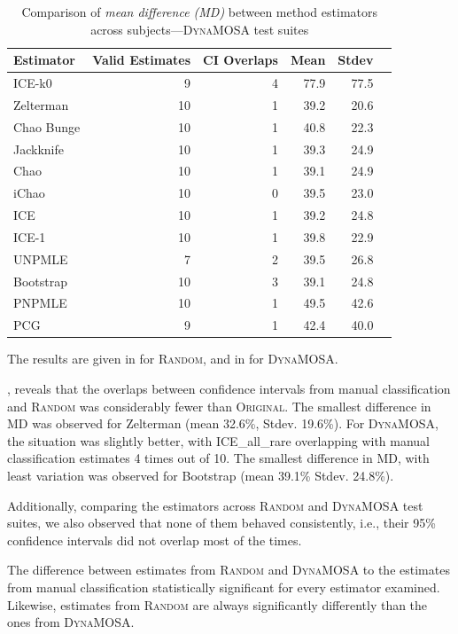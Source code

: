 \documentclass[sigconf,review,anonymous]{acmart}
\newcommand{\ICEallrare}{ICE-k0\xspace}
\newcommand{\Zelterman}{Zelterman\xspace}
\newcommand{\ChaoBunge}{Chao Bunge\xspace}
\newcommand{\Jackknife}{Jackknife\xspace}
\newcommand{\Chao}{Chao\xspace}
\newcommand{\improvedChao}{iChao\xspace}
\newcommand{\ICE}{ICE\xspace}
\newcommand{\improvedICE}{ICE-1\xspace}
\newcommand{\Unpmle}{UNPMLE\xspace}
\newcommand{\Bootstrap}{Bootstrap\xspace}
\newcommand{\Pnpmle}{PNPMLE\xspace}
\newcommand{\PCG}{PCG\xspace}
\newcommand{\original}{\textsc{Original}\xspace}
\newcommand{\EvosuiteRandom}{\textsc{Random}\xspace}
\newcommand{\EvosuiteDynamosa}{\textsc{DynaMOSA}\xspace}
\begin{document}
\begin{table}
\caption{Comparison of \emph{mean difference (MD)} between method
estimators across subjects---\EvosuiteDynamosa test suites}
\begin{tabular}{|l|r|r|r|r|r|}
\hline
Estimator	&Valid Estimates	&CI Overlaps	&Mean	&Stdev	\\
\hline
\ICEallrare	&	9	&	4	&77.9	&	77.5\\
\Zelterman	&	10	&	1	&39.2	&	20.6\\
\ChaoBunge	&	10	&	1	&40.8	&	22.3\\
\Jackknife	&	10	&	1	&39.3	&	24.9\\
\Chao	&	10	&	1	&39.1	&	24.9\\
\improvedChao	&	10	&	0	&39.5	&	23.0\\
\ICE	&	10	&	1	&39.2	&	24.8\\
\improvedICE	&	10	&	1	&39.8	&	22.9\\
\Unpmle	&	7	&	2	&39.5	&	26.8\\
\Bootstrap	&	10	&	3	&39.1	&	24.8\\
\Pnpmle	&	10	&	1	&49.5	&	42.6\\
\PCG	&	9	&	1	&42.4	&	40.0\\
\hline
\end{tabular}
\label{tbl:estdynamosa}
\end{table}
The results are given in  for \EvosuiteRandom, and in
 for \EvosuiteDynamosa.

, reveals that the overlaps between confidence intervals
from manual classification and \EvosuiteRandom was considerably fewer than \original.
The smallest difference in MD was observed for \Zelterman
(mean 32.6\%, Stdev. 19.6\%).
%
For \EvosuiteDynamosa, the situation was slightly better, with ICE\_all\_rare
overlapping with manual classification estimates 4 times out of 10.
The smallest difference in MD, with least variation was observed for
Bootstrap (mean 39.1\% Stdev. 24.8\%).

Additionally, comparing the estimators across \EvosuiteRandom and \EvosuiteDynamosa
test suites, we also observed that none of them behaved consistently, i.e.,
their 95\% confidence intervals did not overlap most of the times.

\begin{tcolorbox}[boxrule=0.5pt, arc=4pt, boxsep=0pt, width=\columnwidth]
The difference between estimates from \EvosuiteRandom and \EvosuiteDynamosa
to the estimates from manual classification statistically significant for every estimator examined.
Likewise, estimates from \EvosuiteRandom are always significantly differently
than the ones from \EvosuiteDynamosa.
\end{tcolorbox}
\end{document}
